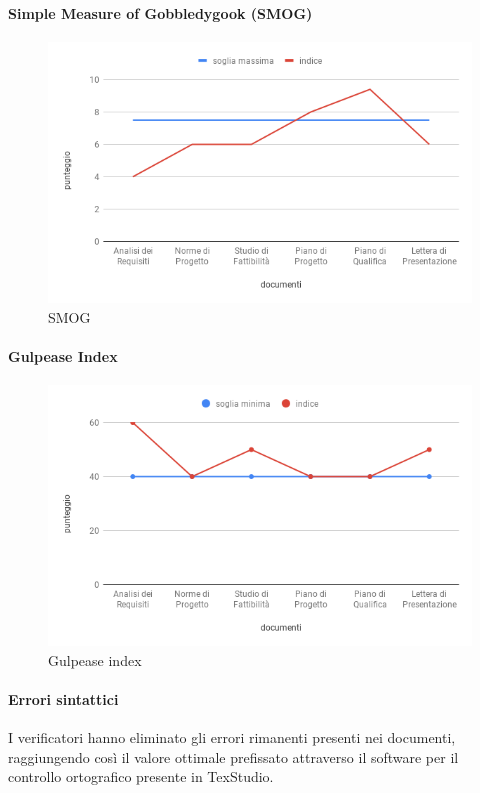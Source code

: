 \paragraph{Simple Measure of Gobbledygook (SMOG)}
\hspace{15cm}
\begin{figure}[!htbp]
	\centering
	\includegraphics[scale=0.5]{Smog.png}
	\caption{SMOG}
\end{figure}
\clearpage
\paragraph{Gulpease Index}
\hspace{15cm}
\begin{figure}[!htbp]
	\centering
	\includegraphics[scale=0.5]{GulpeaseIndex.png}
	\caption{Gulpease index}
\end{figure}

\paragraph{Errori sintattici}
\hspace{15cm}
 I verificatori hanno eliminato gli errori rimanenti presenti nei documenti, raggiungendo così il valore ottimale prefissato attraverso il software per il controllo ortografico presente in TexStudio. 
